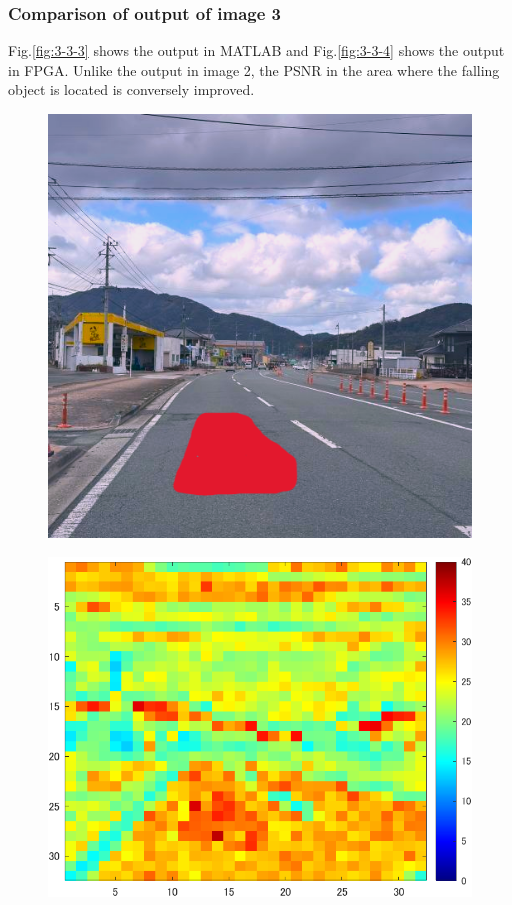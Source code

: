 \documentclass[conference]{IEEEtran}
\begin{document}
\subsubsection{Comparison of output of image 3 }%
Fig.\ref{fig:3-3-3} shows the output in MATLAB and Fig.\ref{fig:3-3-4} shows the output in FPGA.
Unlike the output in image 2, the PSNR in the area where the falling object is located is conversely improved.
\begin{figure}[tb]
  \begin{minipage}[t]{0.32\columnwidth}
    \centering
    \includegraphics[width=0.9\columnwidth]{figures/Ex_pr3.png}
    \label{fig:3-3-2}
  \end{minipage}
  \begin{minipage}[t]{0.32\linewidth}
    \centering
    \includegraphics[width=0.9\columnwidth]{figures/Ex_re5.png}

\end{minipage}
\end{figure}
\end{document}
